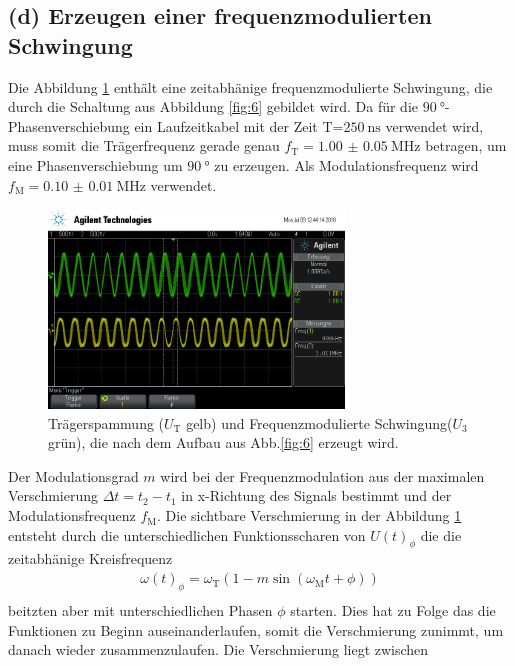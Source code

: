 \FloatBarrier
\subsection{(d) Erzeugen einer frequenzmodulierten Schwingung}
\label{subsec:auswertung_d}
Die Abbildung \ref{fig:freq_zeit} enthält eine zeitabhänige frequenzmodulierte
Schwingung, die durch die Schaltung aus Abbildung \ref{fig:6}
gebildet wird.
Da für die  $\SI{90}{\degree}$-Phasenverschiebung ein Laufzeitkabel mit der
Zeit T=$\SI{250}{\nano\second}$ verwendet wird, muss somit die
Trägerfrequenz gerade genau $f_{\text{T}} = \SI{1.00(5)}{\mega\hertz}$
betragen, um eine Phasenverschiebung um $\SI{90}{\degree}$
zu erzeugen. Als Modulationsfrequenz wird
$f_{\text{M}}=\SI{0.10(1)}{\mega\hertz}$ verwendet.

\begin{figure}
  \centering
  \includegraphics[width=0.7\textwidth]{osci/freq_mod.png}
  \caption{Trägerspammung ($U_{\text{T}}$ gelb) und Frequenzmodulierte
  Schwingung($U_3$ grün), die nach dem Aufbau aus Abb.\ref{fig:6} erzeugt wird.}
  \label{fig:freq_zeit}
\end{figure}
Der Modulationsgrad $m$ wird
bei der Frequenzmodulation
aus der maximalen Verschmierung
$\Delta t=t_2-t_1$ in x-Richtung des Signals bestimmt
und der Modulationsfrequenz $f_{\text{M}}$.
Die sichtbare Verschmierung in der
Abbildung \ref{fig:freq_zeit}
entsteht durch die unterschiedlichen
Funktionsscharen von $U(t)_{\phi}$ die
die zeitabhänige Kreisfrequenz
\begin{align}
\omega(t)_{\phi}=\omega_\text{T}\left(1-m\sin(\omega_\text{M}t + \phi)\right)\\
\end{align}
beitzten aber mit unterschiedlichen Phasen $\phi$ starten.
Dies hat zu Folge das die Funktionen zu Beginn
auseinanderlaufen, somit die Verschmierung
zunimmt, um danach wieder
zusammenzulaufen.
Die Verschmierung liegt zwischen
